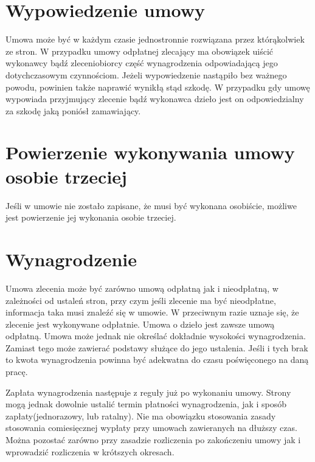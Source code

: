 \section[Wypowiedzenie umowy][Wypowiedzenie umowy]{Wypowiedzenie umowy}
Umowa może być w każdym czasie jednostronnie rozwiązana przez którąkolwiek ze stron. W przypadku umowy odpłatnej zlecający ma obowiązek uiścić wykonawcy bądź zleceniobiorcy część wynagrodzenia odpowiadającą jego dotychczasowym czynnościom. Jeżeli wypowiedzenie nastąpiło bez ważnego powodu, powinien także naprawić wynikłą stąd szkodę. W przypadku gdy umowę wypowiada przyjmujący zlecenie bądź wykonawca dzieło jest on odpowiedzialny za szkodę jaką poniósł zamawiający.

\section[Powierzenie wykonywania umowy osobie trzeciej][Powierzenie wykonywania umowy osobie trzeciej]{Powierzenie wykonywania umowy osobie trzeciej}
Jeśli w umowie nie zostało zapisane, że musi być wykonana osobiście, możliwe jest powierzenie jej wykonania osobie trzeciej.

\section[Wynagrodzenie][Wynagrodzenie]{Wynagrodzenie}
Umowa zlecenia może być zarówno umową odpłatną jak i nieodpłatną, w zależności od ustaleń stron, przy czym jeśli zlecenie ma być nieodpłatne, informacja taka musi znaleźć się w umowie. W przeciwnym razie uznaje się, że zlecenie jest wykonywane odpłatnie. Umowa o dzieło jest zawsze umową odpłatną. Umowa może jednak nie określać dokładnie wysokości wynagrodzenia. Zamiast tego może zawierać podstawy służące do jego ustalenia. Jeśli i tych brak to kwota wynagrodzenia powinna być adekwatna do czasu poświęconego na daną pracę.

Zapłata wynagrodzenia następuje z reguły już po wykonaniu umowy. Strony mogą jednak dowolnie ustalić termin płatności wynagrodzenia, jak i sposób zapłaty(jednorazowy, lub ratalny). Nie ma obowiązku stosowania zasady stosowania comiesięcznej wypłaty przy umowach zawieranych na dłuższy czas. Można pozostać zarówno przy zasadzie rozliczenia po zakończeniu umowy jak i wprowadzić rozliczenia w krótszych okresach.


